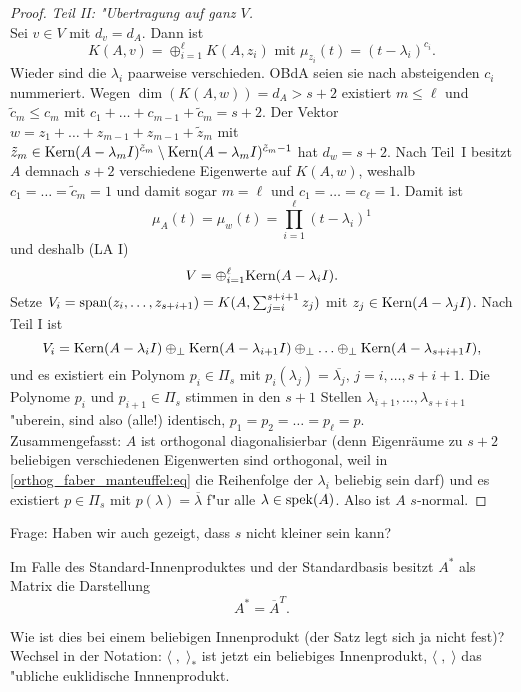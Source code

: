 \begin{proof}
{\em Teil II: "Ubertragung auf ganz $V$.} \\
Sei $v \in V$ mit $d_v = d_A$. Dann ist
\[
K(A,v) = \oplus_{i=1}^\ell K(A,z_i) \mbox{ mit } \mu_{z_i}(t) = (t-\lambda_i)^{c_i}.
\]
Wieder sind die $\lambda_i$ paarweise verschieden. OBdA seien sie nach absteigenden
$c_i$ nummeriert. Wegen $\dim(K(A,w)) = d_A > s+2$ existiert $m \leq \ell$ und $\tilde{c}_m
\leq c_m$ mit $c_1+\ldots + c_{m-1} + \tilde{c}_m = s+2$. Der Vektor $w = z_1 + \ldots +z_{m-1}
+ z_{m-1} + \tilde{z}_m$ mit $\tilde{z}_m \in \mbox{Kern}(A-\lambda_m I)^{\tilde{c}_m} \setminus
\mbox{Kern}(A-\lambda_m I)^{\tilde{c}_m-1} $ hat $d_w = s+2$. Nach Teil~I besitzt $A$ 
demnach $s+2$
verschiedene Eigenwerte auf $K(A,w)$, weshalb $c_1 = \ldots = \tilde{c}_m=1$ und damit
sogar $m=\ell$ und $c_1 = \ldots = c_\ell = 1$. Damit ist
\[
\mu_A(t) = \mu_w(t)  = \prod_{i=1}^\ell (t-\lambda_i)^1
\]
und deshalb (LA I)
\[
V = \oplus_{i=1}^\ell \mbox{Kern} (A - \lambda_i I).
\]
Setze $V_i = \operatorname{span}(z_i,\ldots,z_{s+i+1}) = K(A,\sum_{j=i}^{s+i+1} z_j)$
mit $z_j \in \mbox{Kern}(A-\lambda_j I)$. Nach Teil I ist
\begin{equation} \label{orthog_faber_manteuffel:eq}
V_i = \mbox{Kern}(A-\lambda_i I) \oplus_\perp \mbox{Kern}(A-\lambda_{i+1} I) \oplus_\perp 
         \ldots \oplus_\perp \mbox{Kern}(A-\lambda_{s+i+1} I),
\end{equation}
und es existiert ein Polynom $p_i \in \Pi_{s}$ mit $p_i(\lambda_j) = \overline{\lambda_j},
\, j=i,\ldots,s+i+1$. Die Polynome $p_i$ und $p_{i+1} \in \Pi_s$ stimmen in den $s+1$ Stellen $\lambda_{i+1}, \ldots, \lambda_{s+i+1}$ "uberein, sind also (alle!) identisch, $p_1=p_2
= \ldots = p_\ell = p$.
\\
Zusammengefasst: $A$ ist orthogonal diagonalisierbar (denn Eigenr\"aume zu $s+2$ beliebigen verschiedenen Eigenwerten sind orthogonal, weil in \eqref{orthog_faber_manteuffel:eq} die Reihenfolge der $\lambda_i$ beliebig sein darf)  und es existiert $p \in \Pi_s$ mit $p(\lambda) =
\overline{\lambda}$ f"ur alle $\lambda \in \operatorname{spek}(A)$. Also ist $A$ $s$-normal.
\end{proof}
\medskip

Frage: Haben wir auch gezeigt, dass $s$ nicht kleiner sein kann?
\medskip

Im Falle des Standard-Innenproduktes und der Standardbasis 
besitzt $A^*$ als Matrix die Darstellung
\[
A^* = \overline{A}^T.
\]

Wie ist dies bei einem beliebigen Innenprodukt (der Satz legt sich ja
nicht fest)? \\
Wechsel in der Notation: $\langle \; , \; \rangle_*$ ist jetzt ein beliebiges
Innenprodukt, $\langle \; , \; \rangle$ das "ubliche euklidische Innnenprodukt.


